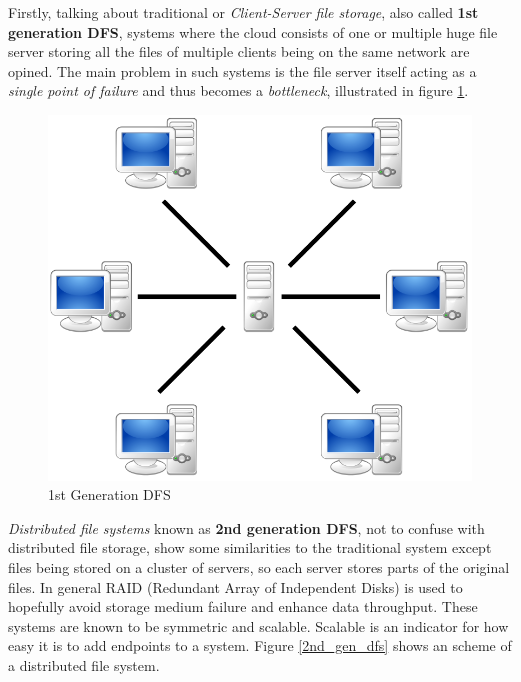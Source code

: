 Firstly, talking about traditional or \textit{Client-Server file storage}, also called \textbf{1st generation DFS}, systems where the cloud consists of one or multiple huge file server storing all the files of multiple clients being on the same network are opined. The main problem in such systems is the file server itself acting as a \textit{single point of failure} and thus becomes a \textit{bottleneck}, illustrated in figure \ref{1st_gen_dfs}.
	\begin{figure}[H]
		\begin{center}
		\includegraphics[scale=0.25]{Talk5/1st_gen_dfs.PNG}
		\end{center}
		\caption{1st Generation DFS \cite{wikimedia:p2p}}
		\label{1st_gen_dfs}
	\end{figure}
\textit{Distributed file systems} known as \textbf{2nd generation DFS}, not to confuse with distributed file storage, show some similarities to the traditional system except files being stored on a cluster of servers, so each server stores parts of the original files. In general RAID (Redundant Array of Independent Disks) is used to hopefully avoid storage medium failure and enhance data throughput. These systems are known to be symmetric and scalable. Scalable is an indicator for how easy it is to add endpoints to a system. Figure \ref{2nd_gen_dfs} shows an scheme of a distributed file system.

